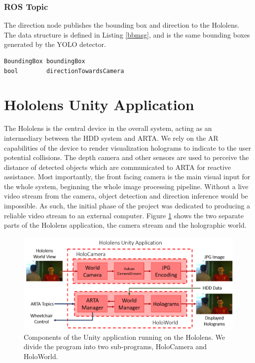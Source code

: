\vspace{-1\baselineskip}

\subsubsection{ROS Topic} \label{sec:yachtDirROS}
The direction node publishes the bounding box and direction to the Hololens. The  data structure is defined in Listing \ref{bbmsg}, and is the same bounding boxes generated by the YOLO detector. \\

\begin{lstlisting}[language=Mymatlab,caption={ROS message structure for BoundingBoxDirection.msg}]
BoundingBox boundingBox
bool        directionTowardsCamera
\end{lstlisting}

\newpage
\section{Hololens Unity Application}
The Hololens is the central device in the overall system, acting as an intermediary between the HDD system and ARTA. We rely on the AR capabilities of the device to render visualization holograms to indicate to the user potential collisions. The depth camera and other sensors are used to perceive the distance of detected objects which are communicated to ARTA for reactive assistance. Most importantly, the front facing camera is the main visual input for the whole system, beginning the whole image processing pipeline. Without a live video stream from the camera, object detection and direction inference would be impossible. As such, the initial phase of the project was dedicated to producing a reliable video stream to an external computer. Figure \ref{fig:detailedHololens} shows the two separate parts of the Hololens application, the camera stream and the holographic world. 

\begin{figure}[ht]
	\centering
	\includegraphics[width=1.0\linewidth]{img/chapter5_implementation/hololensSystemDiagram.png}
	\caption{Components of the Unity application running on the Hololens. We divide the program into two sub-programs, HoloCamera and HoloWorld.}
	\label{fig:detailedHololens}
\end{figure}

